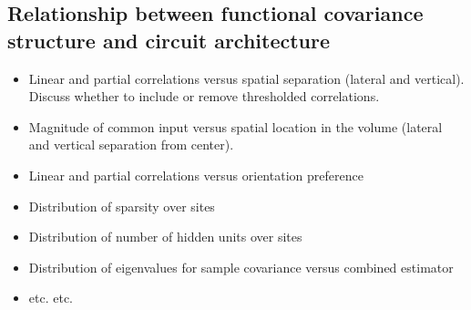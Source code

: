 \subsection*{Relationship between functional covariance structure and circuit architecture}


\begin{itemize}
\item Linear and partial correlations versus spatial separation (lateral and vertical). Discuss whether to include or remove thresholded correlations.
\item Magnitude of common input versus spatial location in the volume (lateral and vertical separation from center).
\item Linear and partial correlations versus orientation preference
\item Distribution of sparsity over sites
\item Distribution of number of hidden units over sites
\item Distribution of eigenvalues for sample covariance versus combined estimator
\item etc. etc. 

\end{itemize}





